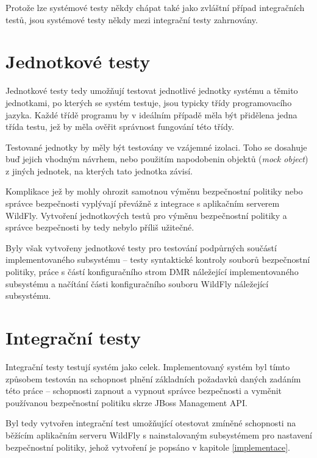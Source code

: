 Protože lze systémové testy někdy chápat také jako zvláštní případ integračních testů, jsou systémové testy někdy mezi integrační testy zahrnovány. \cite{testsUnitVsInteg}

\section{Jednotkové testy}

Jednotkové testy tedy umožňují testovat jednotlivé jednotky systému a těmito jednotkami, po kterých se systém testuje, jsou typicky třídy programovacího jazyka. Každé třídě programu by v ideálním případě měla být přidělena jedna třída testu, jež by měla ověřit správnost fungování této třídy. \cite{ivsTest}

Testované jednotky by měly být testovány ve vzájemné izolaci. Toho se dosahuje buď jejich vhodným návrhem, nebo použitím napodobenin objektů ({\it mock object}) z jiných jednotek, na kterých tato jednotka závisí. \cite{ivsTest}

Komplikace jež by mohly ohrozit samotnou výměnu bezpečnostní politiky nebo správce bezpečnosti vyplývají převážně z integrace s aplikačním serverem WildFly. Vytvoření jednotkových testů pro výměnu bezpečnostní politiky a správce bezpečnosti by tedy nebylo příliš užitečné.

Byly však vytvořeny jednotkové testy pro testování podpůrných součástí implementovaného subsystému -- testy syntaktické kontroly souborů bezpečnostní politiky, práce s částí konfiguračního strom DMR náležející implementovaného subsystému a načítání části konfiguračního souboru WildFly náležející subsystému.

\section{Integrační testy}

Integrační testy testují systém jako celek. Implementovaný systém byl tímto způsobem testován na schopnost plnění základních požadavků daných zadáním této práce -- schopnosti zapnout a vypnout správce bezpečnosti a vyměnit používanou bezpečnostní politiku skrze JBoss Management API.

Byl tedy vytvořen integrační test umožňující otestovat zmíněné schopnosti na běžícím aplikačním serveru WildFly s nainstalovaným subsystémem pro nastavení bezpečnostní politiky, jehož vytvoření je popsáno v kapitole \ref{implementace}.

